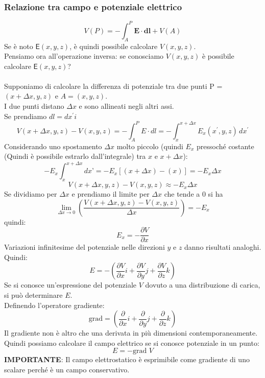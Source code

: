 \documentclass[../main.tex]{subfiles}
\begin{document}
	\subsubsection{Relazione tra campo e potenziale elettrico}
	$$ V(P) = - \int_{A}^{P} \boldsymbol{E} \cdot \boldsymbol{d} \boldsymbol{l} + V(A) $$
	Se è noto $\mathsf{E}(x,y,z)$, è quindi possibile calcolare $V(x,y,z)$. \\
	Pensiamo ora all’operazione inversa: se conosciamo $V(x,y,z)$ è possibile calcolare $\mathsf{E}(x,y,z)$?\\\\
	Supponiamo di calcolare la differenza di potenziale tra due punti P = $(x + \Delta x, y, z)$ e $A = (x, y, z)$. \\
	I due punti distano $\Delta x$ e sono allineati negli altri assi.\\
	Se prendiamo $dl = dx^\prime i$
	$$ V(x + \Delta x, y, z) - V(x, y, z) = - \int_{A}^{P} E \cdot d l = - \int_{x}^{x + \Delta x} E_{x}(x^\prime, y, z) \, dx^\prime $$
	Considerando uno spostamento $\Delta x$ molto piccolo (quindi $E_{x}$ pressoché costante (Quindi è possibile estrarlo dall'integrale) tra $x$ e $x + \Delta x$):
	$$ -E_{x} \int_{x}^{x + \Delta x} dx’ = - E_{x} \left[ (x + \Delta x) - (x) \right] = - E_{x} \Delta x $$
	$$ V(x + \Delta x, y, z) - V(x, y, z) \approx - E_{x} \Delta x $$
	Se dividiamo per $\Delta x$ e prendiamo il limite per $\Delta x$ che tende a 0 si ha
	$$ \lim_{\Delta x \to 0} \left( \frac{V(x + \Delta x, y, z) - V(x, y, z)}{\Delta x} \right) = - E_{x} $$
	quindi:
	$$ E_{x} = - \frac{\partial V}{\partial x} $$
	Variazioni infinitesime del potenziale nelle direzioni $y$ e $z$ danno risultati analoghi. \\
	Quindi:
	$$ E = - \left(\frac {\partial V}{\partial x} i + \frac {\partial V}{\partial y} j + \frac {\partial V}{\partial z} k\right) $$
	Se si conosce un’espressione del potenziale $V$ dovuto a una distribuzione di carica, si può determinare $E$.\\
	Definendo l’operatore gradiente:
	$$\boxed{\text{grad} = \left(\frac{\partial}{\partial x} i + \frac{\partial}{\partial y} j + \frac{\partial}{\partial z} k\right)}$$
	Il gradiente non è altro che una derivata in più dimensioni contemporaneamente.\\
	Quindi possiamo calcolare il campo elettrico se si conosce potenziale in un punto:
	$$ E = - \text{grad } V $$
	\textbf{IMPORTANTE}: Il campo elettrostatico è esprimibile come gradiente di uno scalare perché è un campo conservativo.\\\\
\end{document}

